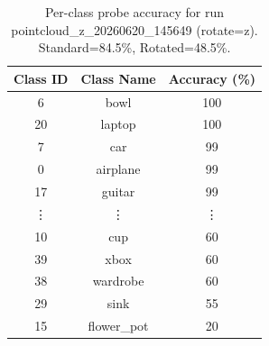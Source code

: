 \begin{table}
\caption{Per-class probe accuracy for run pointcloud_z_20260620_145649 (rotate=z). Standard=84.5\%, Rotated=48.5\%.}
\label{tab:per_class_accuracy_0cqj036c}
\begin{tabular}{ccc}
\toprule
Class ID & Class Name & Accuracy (\%) \\
\midrule
6 & bowl & 100 \\
20 & laptop & 100 \\
7 & car & 99 \\
0 & airplane & 99 \\
17 & guitar & 99 \\
\vdots & \vdots & \vdots \\
10 & cup & 60 \\
39 & xbox & 60 \\
38 & wardrobe & 60 \\
29 & sink & 55 \\
15 & flower_pot & 20 \\
\bottomrule
\end{tabular}
\end{table}

